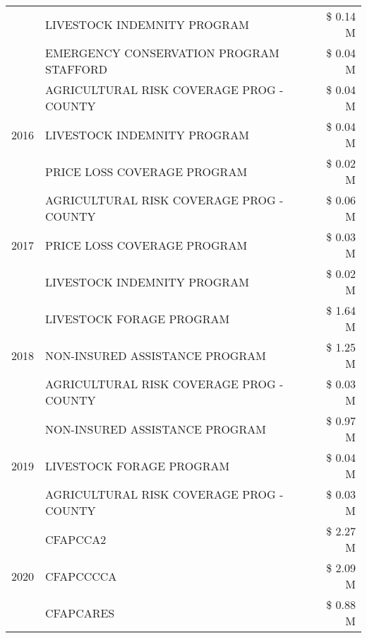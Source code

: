 \begin{tabular}{llr}
 & LIVESTOCK INDEMNITY PROGRAM & \$ 0.14 M \\
 & EMERGENCY CONSERVATION PROGRAM STAFFORD & \$ 0.04 M \\
\cline{1-3}
\multirow[t]{3}{*}{2016} & AGRICULTURAL RISK COVERAGE PROG - COUNTY      & \$ 0.04 M \\
 & LIVESTOCK INDEMNITY PROGRAM                   & \$ 0.04 M \\
 & PRICE LOSS COVERAGE PROGRAM                   & \$ 0.02 M \\
\cline{1-3}
\multirow[t]{3}{*}{2017} & AGRICULTURAL RISK COVERAGE PROG - COUNTY & \$ 0.06 M \\
 & PRICE LOSS COVERAGE PROGRAM & \$ 0.03 M \\
 & LIVESTOCK INDEMNITY PROGRAM & \$ 0.02 M \\
\cline{1-3}
\multirow[t]{3}{*}{2018} & LIVESTOCK FORAGE PROGRAM & \$ 1.64 M \\
 & NON-INSURED ASSISTANCE PROGRAM & \$ 1.25 M \\
 & AGRICULTURAL RISK COVERAGE PROG - COUNTY & \$ 0.03 M \\
\cline{1-3}
\multirow[t]{3}{*}{2019} & NON-INSURED ASSISTANCE PROGRAM & \$ 0.97 M \\
 & LIVESTOCK FORAGE PROGRAM & \$ 0.04 M \\
 & AGRICULTURAL RISK COVERAGE PROG - COUNTY & \$ 0.03 M \\
\cline{1-3}
\multirow[t]{3}{*}{2020} & CFAPCCA2 & \$ 2.27 M \\
 & CFAPCCCCA & \$ 2.09 M \\
 & CFAPCARES & \$ 0.88 M \\
\cline{1-3}
\bottomrule
\end{tabular}
